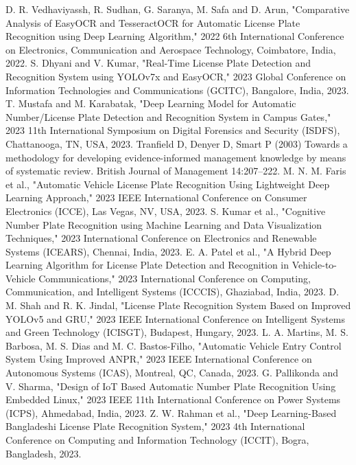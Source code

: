 \documentclass[conference]{IEEEtran}
\begin{document}
	
	\begin{thebibliography}{00}
		 D. R. Vedhaviyassh, R. Sudhan, G. Saranya, M. Safa and D. Arun, "Comparative Analysis of EasyOCR and TesseractOCR for Automatic License Plate Recognition using Deep Learning Algorithm," 2022 6th International Conference on Electronics, Communication and Aerospace Technology, Coimbatore, India, 2022.
		 S. Dhyani and V. Kumar, "Real-Time License Plate Detection and Recognition System using YOLOv7x and EasyOCR," 2023 Global Conference on Information Technologies and Communications (GCITC), Bangalore, India, 2023.
		 T. Mustafa and M. Karabatak, "Deep Learning Model for Automatic Number/License Plate Detection and Recognition System in Campus Gates," 2023 11th International Symposium on Digital Forensics and Security (ISDFS), Chattanooga, TN, USA, 2023.
		 Tranfield D, Denyer D, Smart P (2003) Towards a methodology for developing evidence-informed management knowledge by means of systematic review. British Journal of Management 14:207–222.
		 M. N. M. Faris et al., "Automatic Vehicle License Plate Recognition Using Lightweight Deep Learning Approach," 2023 IEEE International Conference on Consumer Electronics (ICCE), Las Vegas, NV, USA, 2023.
		 S. Kumar et al., "Cognitive Number Plate Recognition using Machine Learning and Data Visualization Techniques," 2023 International Conference on Electronics and Renewable Systems (ICEARS), Chennai, India, 2023.
		 E. A. Patel et al., "A Hybrid Deep Learning Algorithm for License Plate Detection and Recognition in Vehicle-to-Vehicle Communications," 2023 International Conference on Computing, Communication, and Intelligent Systems (ICCCIS), Ghaziabad, India, 2023.
		 D. M. Shah and R. K. Jindal, "License Plate Recognition System Based on Improved YOLOv5 and GRU," 2023 IEEE International Conference on Intelligent Systems and Green Technology (ICISGT), Budapest, Hungary, 2023.
		 L. A. Martins, M. S. Barbosa, M. S. Dias and M. C. Bastos-Filho, "Automatic Vehicle Entry Control System Using Improved ANPR," 2023 IEEE International Conference on Autonomous Systems (ICAS), Montreal, QC, Canada, 2023.
		 G. Pallikonda and V. Sharma, "Design of IoT Based Automatic Number Plate Recognition Using Embedded Linux," 2023 IEEE 11th International Conference on Power Systems (ICPS), Ahmedabad, India, 2023.
		 Z. W. Rahman et al., "Deep Learning-Based Bangladeshi License Plate Recognition System," 2023 4th International Conference on Computing and Information Technology (ICCIT), Bogra, Bangladesh, 2023.

\end{thebibliography}
\end{document}

